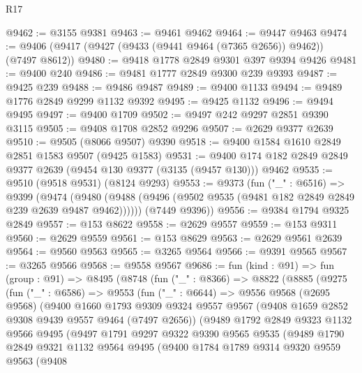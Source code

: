 \begin{lexlean}{R17}
\begin{coremodule}
@9462 := @3155 @9381
@9463 := @9461 @9462
@9464 := @9447 @9463
@9474 := @9406 (@9417 (@9427 (@9433 (@9441 @9464 (@7365 @2656)) @9462)) (@7497 @8612))
@9480 := @9418 @1778 @2849 @9301 @397 @9394 @9426
@9481 := @9400 @240
@9486 := @9481 @1777 @2849 @9300 @239 @9393
@9487 := @9425 @239
@9488 := @9486 @9487
@9489 := @9400 @1133
@9494 := @9489 @1776 @2849 @9299 @1132 @9392
@9495 := @9425 @1132
@9496 := @9494 @9495
@9497 := @9400 @1709
@9502 := @9497 @242 @9297 @2851 @9390 @3115
@9505 := @9408 @1708 @2852 @9296
@9507 := @2629 @9377 @2639
@9510 := @9505 (@8066 @9507) @9390
@9518 := @9400 @1584 @1610 @2849 @2851 @1583 @9507 (@9425 @1583)
@9531 := @9400 @174 @182 @2849 @2849 @9377 @2639 (@9454 @130 @9377 (@3135 (@9457 @130))) @9462
@9535 := @9510 (@9518 @9531) (@8124 @9293)
@9553 := @9373
    (fun ("_" : @6516) =>
    @9399
      (@9474 (@9480 (@9488 (@9496 (@9502 @9535 (@9481 @182 @2849 @2849 @239 @2639 @9487 @9462))))))
      (@7449 @9396))
@9556 := @9384 @1794 @9325 @2849
@9557 := @153 @8622
@9558 := @2629 @9557
@9559 := @153 @9311
@9560 := @2629 @9559
@9561 := @153 @8629
@9563 := @2629 @9561 @2639
@9564 := @9560 @9563
@9565 := @3265 @9564
@9566 := @9391 @9565
@9567 := @3265 @9566
@9568 := @9558 @9567
@9686 := fun (kind : @91) =>
  fun (group : @91) =>
  @8495
    (@8748
      (fun ("_" : @8366) =>
      @8822
        (@8885
          (@9275
            (fun ("_" : @6586) =>
            @9553
              (fun ("_" : @6644) =>
              @9556
                @9568
                (@2695 @9568)
                (@9400
                  @1660
                  @1793
                  @9309
                  @9324
                  @9557
                  @9567
                  (@9408 @1659 @2852 @9308 @9439 @9557 @9464 (@7497 @2656))
                  (@9489
                    @1792
                    @2849
                    @9323
                    @1132
                    @9566
                    @9495
                    (@9497
                      @1791
                      @9297
                      @9322
                      @9390
                      @9565
                      @9535
                      (@9489
                        @1790
                        @2849
                        @9321
                        @1132
                        @9564
                        @9495
                        (@9400
                          @1784
                          @1789
                          @9314
                          @9320
                          @9559
                          @9563
                          (@9408

\end{coremodule}
\end{lexlean}
